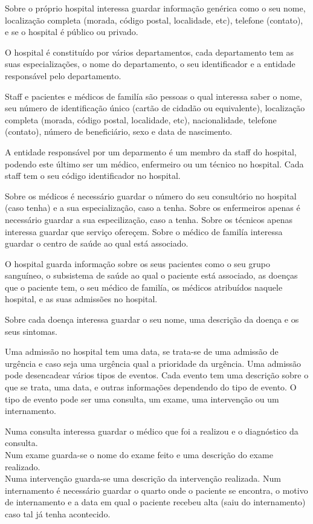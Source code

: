 \documentclass[article, a4paper, 12pt, oneside]{memoir}
\begin{document}
Sobre o próprio hospital interessa guardar informação genérica como o seu nome, localização completa (morada, código postal, localidade, etc), telefone (contato), e se o hospital é público ou privado.

O hospital é constituído por vários departamentos, cada departamento tem as suas especializações, o nome do departamento, o seu identificador e a entidade responsável pelo departamento.

Staff e pacientes e médicos de familía são pessoas o qual interessa saber o nome, seu número de identificação único (cartão de cidadão ou equivalente), localização completa (morada, código postal, localidade, etc), nacionalidade, telefone (contato), número de beneficiário, sexo e data de nascimento.

A entidade responsável por um deparmento é um membro da staff do hospital, podendo este último ser um médico, enfermeiro ou um técnico no hospital. Cada staff tem o seu código identificador no hospital.

Sobre os médicos é necessário guardar o número do seu consultório no hospital (caso tenha) e a sua especialização, caso a tenha.
Sobre os enfermeiros apenas é necessário guardar a sua especilização, caso a tenha.
Sobre os técnicos apenas interessa guardar que serviço ofereçem.
Sobre o médico de familía interessa guardar o centro de saúde ao qual está associado.

O hospital guarda informação sobre os seus pacientes como o seu grupo sanguíneo, o subsistema de saúde ao qual o paciente está associado, as doenças que o paciente tem, o seu médico de familía, os médicos atribuídos naquele hospital,  e as suas admissões no hospital.

Sobre cada doença interessa guardar o seu nome, uma descrição da doença e os seus sintomas.

Uma admissão no hospital tem uma data, se trata-se de uma admissão de urgência e caso seja uma urgência qual a prioridade da urgência. Uma admissão pode desencadear vários tipos de eventos. Cada evento tem uma descrição sobre o que se trata, uma data, e outras informações dependendo do tipo de evento. O tipo de evento pode ser uma consulta, um exame, uma intervenção ou um internamento.

Numa consulta interessa guardar o médico que foi a realizou e o diagnóstico da consulta.\\
Num exame guarda-se o nome do exame feito e uma descrição do exame realizado.\\
Numa intervenção guarda-se uma descrição da intervenção realizada.
Num internamento é necessário guardar o quarto onde o paciente se encontra, o motivo de internamento e a data em qual o paciente recebeu alta (saiu do internamento) caso tal já tenha acontecido.
\end{document}
